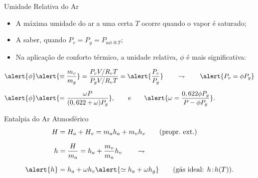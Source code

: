     \begin{frame}{Umidade Relativa do Ar}\vspace*{-0em}
        \begin{itemize}
            \item<1-> A máxima umidade do ar a uma certa $T$ ocorre quando o vapor é
                \alert{saturado};
            \item<1-> A saber, quando \alert{$P_v = P_g = P_{\mathrm{sat}\,@\,T}$};
            \item<1-> Na aplicação de \alert{conforto térmico}, a \alert{unidade relativa},
                \alert{$\phi$} é mais significativa:
        \end{itemize}
        \begin{align*}
            \alert{\phi} &
            \alert{\equiv \frac{m_v}{m_g}}
            =\frac{P_vV/R_vT}{P_gV/R_vT} = \alert{\frac{P_v}{P_g}}
            \qquad\rightharpoondown\qquad
            \alert{P_v = \phi P_g}
            \\[\medskipamount]
            \alert{\phi} &
            \alert{=\frac{\omega P}{(0,622+\omega)P_g}},
            \qquad\mbox{e}\qquad
            \alert{\omega=\frac{0,622\phi P_g}{P-\phi P_g}}.
        \end{align*}
    \end{frame}

    \begin{frame}{Entalpia do Ar Atmosférico}\vspace*{-0em}
        \begin{align*}
            H &= H_a + H_v = m_ah_a + m_vh_v
            \qquad\mbox{(propr.~ext.)}
            \\[\medskipamount]
            h &= \frac{H}{m_a} = h_a + \frac{m_v}{m_a}h_v
            \qquad\rightharpoondown
            \\[\medskipamount]
            \alert{h} &
            = h_a + \omega h_v
            \alert{\simeq h_a + \omega h_g}
            \qquad\mbox{(gás ideal: $h\!:\!h(T)$)}.
        \end{align*}
    \end{frame}

